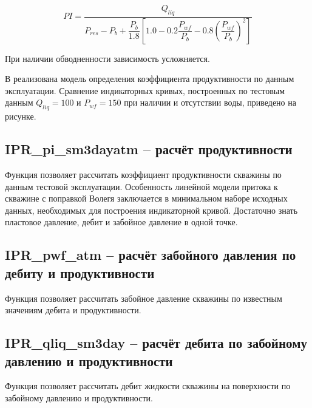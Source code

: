  \begin{equation}\label{eq_Vogel} 
 PI = \frac{Q_{liq}}{P_{res} - P_{b} + \dfrac{P_{b}}{1.8} \left[ 1.0 - 0.2  \dfrac{P_{wf}}{P_{b}}- 0.8 \left( \dfrac{P_{wf}}{P_{b}} \right)^2 \right] }   
 \end{equation}
 
 При наличии обводненности зависимость усложняется.
 
 В \unf{} реализована модель определения коэффициента продуктивности по данным эксплуатации. Сравнение индикаторных кривых, построенных по тестовым данным $Q_{liq} = 100$ и $P_{wf} = 150$ при наличии и отсутствии воды, приведено на рисунке. 
 
 \newcommand{\IPRFile}{data/IPR_fw_data.txt}
 
 

\subsection{IPR\_pi\_sm3dayatm – расчёт продуктивности}
Функция позволяет рассчитать коэффициент продуктивности скважины по данным тестовой эксплуатации. Особенность линейной модели притока к скважине с поправкой Волегя заключается в минимальном наборе исходных данных, необходимых для построения индикаторной кривой. Достаточно знать пластовое давление, дебит и забойное давление в одной точке.



\subsection{IPR\_pwf\_atm – расчёт забойного давления по дебиту и продуктивности}
Функция позволяет рассчитать забойное давление скважины по известным значениям дебита и продуктивности.


\subsection{IPR\_qliq\_sm3day – расчёт дебита по забойному давлению и продуктивности}
Функция позволяет рассчитать дебит жидкости скважины на поверхности по забойному давлению и продуктивности.




\newpage
